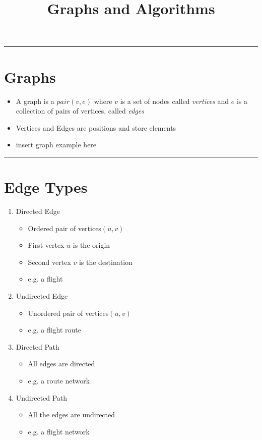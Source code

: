 \documentclass{article}
\title{Graphs and Algorithms}
\begin{document}
\maketitle

\begin{center}
  \rule{0.5\textwidth}{0.4pt}
\end{center}

\section{Graphs}
\begin{itemize}
  \item{A graph is a $pair(v,e)$ where $v$ is a set of nodes called \textit{vertices} and $e$ is a collection of pairs of vertices, called \textit{edges}}
  \item{Vertices and Edges are positions and store elements}
  \item{insert graph example here}
\end{itemize}

\begin{center}
  \rule{0.5\textwidth}{0.4pt}
\end{center}

\section{Edge Types}
\begin{enumerate}
  \item{Directed Edge}
  \begin{itemize}
    \item{Ordered pair of vertices$(u,v)$}
    \item{First vertex $u$ is the origin}
    \item{Second vertex $v$ is the destination}
    \item{e.g. a flight}
  \end{itemize}
  \item{Undirected Edge}
  \begin{itemize}
    \item{Unordered pair of vertices$(u,v)$}
    \item{e.g. a flight route}
  \end{itemize}
  \item{Directed Path}
  \begin{itemize}
    \item{All edges are directed}
    \item{e.g. a route network}
  \end{itemize}
  \item{Undirected Path}
  \begin{itemize}
    \item{All the edges are undirected}
    \item{e.g. a flight network}
  \end{itemize}
\end{enumerate}
\end{document}
